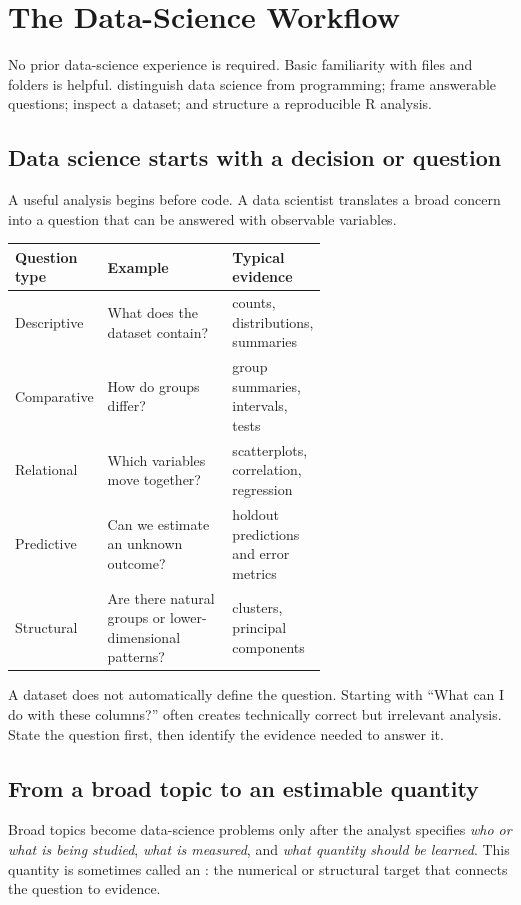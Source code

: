 \chapter{The Data-Science Workflow}
\label{chap:workflow}
\chapterguide
  {No prior data-science experience is required. Basic familiarity with files and folders is helpful.}
  {distinguish data science from programming; frame answerable questions; inspect a dataset; and structure a reproducible R analysis.}

\section{Data science starts with a decision or question}
A useful analysis begins before code. A data scientist translates a broad concern into a question that can be answered with observable variables.

\begin{dstable}
\begin{tabularx}{\linewidth}{@{}
  D{0.15\linewidth}
  D{0.47\linewidth}
  Y@{}}
\toprule
{}
\textbf{Question type} & \textbf{Example} & \textbf{Typical evidence} \\
\midrule
Descriptive & What does the dataset contain? & counts, distributions, summaries \\
Comparative & How do groups differ? & group summaries, intervals, tests \\
Relational & Which variables move together? & scatterplots, correlation, regression \\
Predictive & Can we estimate an unknown outcome? & holdout predictions and error metrics \\
Structural & Are there natural groups or lower-dimensional patterns? & clusters, principal components \\
\bottomrule
\end{tabularx}
\end{dstable}

\begin{pitfall}
A dataset does not automatically define the question. Starting with ``What can I do with these columns?'' often creates technically correct but irrelevant analysis. State the question first, then identify the evidence needed to answer it.
\end{pitfall}


\section{From a broad topic to an estimable quantity}
Broad topics become data-science problems only after the analyst specifies \emph{who or what is being studied}, \emph{what is measured}, and \emph{what quantity should be learned}. This quantity is sometimes called an : the numerical or structural target that connects the question to evidence.


